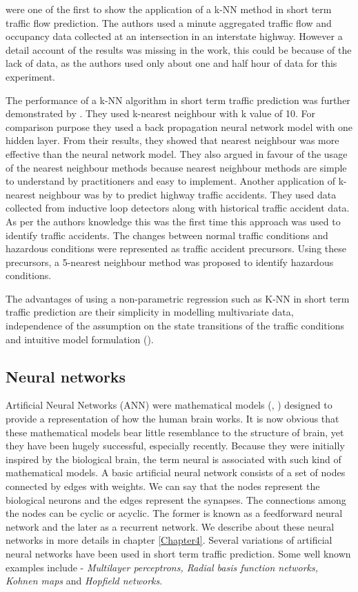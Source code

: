 \citet{davis1991nonparametric} were one of the first to show the application of a k-NN method in short
term traffic flow prediction. The authors used a minute aggregated traffic flow and occupancy data
collected at an intersection in an interstate highway. However a detail account of the results was
missing in the work, this could be because of the lack of data, as the authors used only about one and
half hour of data for this experiment.

The performance of a k-NN algorithm in short term traffic prediction was further demonstrated by
\citet{smith1994comparison}. They used k-nearest neighbour with k value of 10. For comparison purpose
they used a back propagation neural network model with one hidden layer. From their results, they
showed that nearest neighbour was more effective than the neural network model.
They also argued in favour of the usage of the nearest neighbour methods because nearest
neighbour methods are simple to understand by practitioners and easy to implement.
Another application of k-nearest neighbour
was by \citet{lv2009real} to predict highway traffic accidents. They used data collected from
inductive loop detectors along with historical traffic accident data. As per the authors knowledge
this was the first time this approach was used to identify traffic accidents. The changes between
normal traffic conditions and hazardous conditions were represented as traffic accident precursors.
Using these precursors, a 5-nearest neighbour method was proposed to identify hazardous conditions.

The advantages of using a non-parametric regression such as K-NN in short term traffic prediction
are their simplicity in modelling multivariate data, independence of the assumption on the state
transitions of the traffic conditions and intuitive model formulation (\citet{vlahogianni2004short}).

\subsection{Neural networks}
\label{subsec:neuralNetworksTrafficPred}
Artificial Neural Networks (ANN) were mathematical models (\citet{mcculloch1943logical},
\citet{rosenblatt1958perceptron}) designed to  provide a representation of how the human brain
works. It is now obvious that these mathematical models bear little resemblance to the structure
of brain, yet they have been hugely successful, especially recently. Because they were initially inspired by the
biological brain, the term neural is associated with such kind of mathematical models. A basic
artificial neural network consists of a set of nodes connected by edges with weights. We can say
that the nodes represent the biological neurons and the edges represent the synapses. The
connections among the nodes can be cyclic or acyclic. The former is known as a feedforward neural
network and the later as a recurrent network. We describe about these neural networks in more
details in chapter \ref{Chapter4}. Several variations of artificial neural networks have been
used in short term traffic prediction. Some well known examples include - \textit{Multilayer
perceptrons, Radial basis function networks, Kohnen maps} and \textit{Hopfield networks}.

